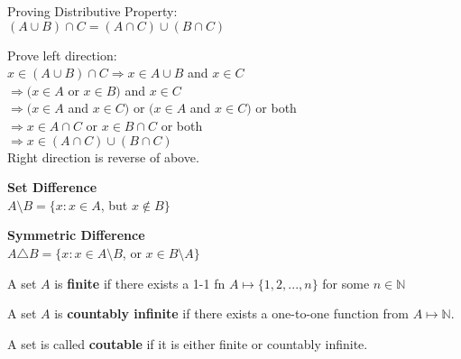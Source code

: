 \documentclass[12pt, oneside, letterpaper]{notes}
\begin{document}
\begin{remark}
	Proving Distributive Property: \\
	$(A \cup B) \cap C = (A \cap C) \cup (B \cap C)$ \\
	
	\begin{myproof}
		Prove left direction: \\
		$x \in (A \cup B) \cap C \Rightarrow x \in A \cup B$ and $x \in C$ \\
		$\Rightarrow (x \in A$ or $x \in B)$ and $x \in C$ \\
		$\Rightarrow (x \in A$ and $x \in C)$ 
		or $(x \in A$ and $x \in C)$ or both \\
		$\Rightarrow  x \in A \cap C$ or $x \in B \cap C$ or both \\
		$\Rightarrow  x \in (A\cap C) \cup (B \cap C)$ \\
		Right direction is reverse of above.
	\end{myproof}
\end{remark}

\begin{mydef}
  \textbf{Set Difference}\\
  \indent $A \setminus B = \{x: x \in A$, but $x \notin B \}$
\end{mydef}

\begin{mydef}
  \textbf{Symmetric Difference}\\
  \indent $A \triangle B = \{x: x \in A \setminus B$, or 
  $x \in B \setminus A \}$
\end{mydef}

\begin{mydef}
  A set $A$ is \textbf{finite} if there exists a 1-1 fn $A \mapsto 
  \{ 1, 2, ..., n \}$ for some $n \in \mathbb{N}$
\end{mydef}

\begin{mydef}
	A set $A$ is \textbf{countably infinite} if there exists a one-to-one
	function from $A \mapsto \mathbb{N}$.
\end{mydef}

\begin{mydef}
	A set is called \textbf{coutable} if it is either finite or countably 
	infinite.
\end{mydef}
\end{document}
